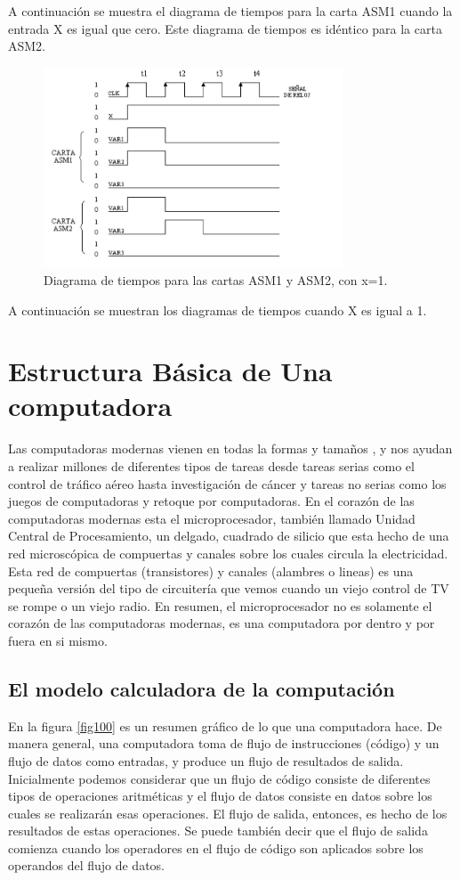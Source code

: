 \documentclass[12pt]{book}
\theoremstyle{definition}
\theoremstyle{remark}
\theoremstyle{plain}
\begin{document}
A continuación se muestra el diagrama de tiempos para la carta ASM1 cuando la entrada X es
igual que cero. Este diagrama de tiempos es idéntico para la carta ASM2.

\begin{figure}
\centering
\includegraphics[width=3.5in]{ASMtiempos2.jpg}
\caption{Diagrama de tiempos para las cartas ASM1 y ASM2, con x=1.}
\label{fig28}
\end{figure}

A continuación se muestran los diagramas de tiempos cuando X es igual a 1.



\chapter{Estructura Básica de Una computadora}

Las computadoras modernas vienen en todas la formas y tamaños , y nos ayudan a realizar millones de diferentes tipos de tareas desde tareas serias como el control de tráfico aéreo hasta investigación de cáncer y tareas no serias como los juegos de computadoras y retoque por computadoras.
 En el corazón de las computadoras modernas esta el microprocesador, también llamado Unidad Central de Procesamiento, un delgado, cuadrado de silicio que esta hecho de una red microscópica de compuertas y canales sobre los cuales circula la electricidad. Esta red de compuertas (transistores) y canales (alambres o lineas) es una pequeña versión del tipo de circuitería que vemos cuando un viejo control de TV se rompe o un viejo radio. En resumen, el microprocesador no es solamente el corazón de las computadoras modernas, es una computadora por dentro y por fuera en si mismo. 
 
 \section{El modelo calculadora de la computación}
 En la figura \ref{fig100} es un resumen gráfico de lo que una computadora hace. De manera general, una computadora toma de flujo de instrucciones (código) y un flujo de datos como entradas, y produce un flujo de resultados de salida. Inicialmente podemos considerar que un flujo de código consiste de diferentes tipos de operaciones aritméticas y el flujo de datos consiste en datos sobre los cuales se realizarán esas operaciones. El flujo de salida, entonces, es hecho de los resultados de estas operaciones. Se puede también decir que el flujo de salida comienza cuando los operadores en el flujo de código son aplicados sobre los operandos del flujo de datos.
 
\end{document}
